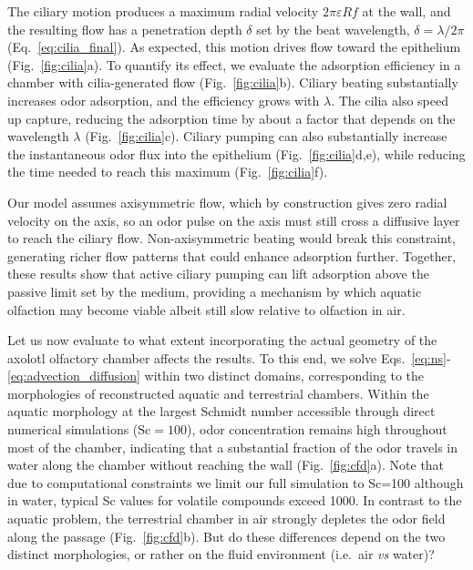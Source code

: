 \documentclass[%
 twocolumn,
 amsmath,amssymb,
 aps,prfluids,
 superscriptaddress,
]{revtex4-2}
\newcommand{\Sc}{\mathrm{Sc}}
\begin{document}
The ciliary motion produces a maximum radial velocity $2\pi\varepsilon R  f$ at the wall, and the resulting flow has a penetration depth $\delta$ set by the beat wavelength, $\delta = \lambda/2\pi$ (Eq.~\eqref{eq:cilia_final}). As expected, this motion drives flow toward the epithelium (Fig.~\ref{fig:cilia}a). To quantify its effect, we evaluate the adsorption efficiency in a chamber with cilia-generated flow (Fig.~\ref{fig:cilia}b). Ciliary beating substantially increases odor adsorption, and the efficiency grows with $\lambda$. The cilia also speed up capture, reducing the adsorption time by about a factor that depends on the wavelength $\lambda$
(Fig.~\ref{fig:cilia}c). Ciliary pumping can also substantially increase the instantaneous odor flux into the epithelium (Fig.~\ref{fig:cilia}d,e), while reducing the time needed to reach this maximum (Fig.~\ref{fig:cilia}f).

Our model assumes axisymmetric flow, which by construction gives zero radial velocity on the axis, so an odor pulse on the axis must still cross a diffusive layer to reach the ciliary flow. Non-axisymmetric beating would break this constraint, generating richer flow patterns that could enhance adsorption further. Together, these results show that active ciliary pumping can lift adsorption above the passive limit set by the medium, providing a mechanism by which aquatic olfaction may become viable albeit still slow relative to olfaction in air. 

Let us now evaluate to what extent incorporating the actual geometry of the axolotl olfactory chamber affects the results. To this end, we solve Eqs.~\eqref{eq:ns}-\eqref{eq:advection_diffusion} within two distinct domains, corresponding to the morphologies of reconstructed aquatic and terrestrial chambers. Within the aquatic morphology at the largest Schmidt number accessible through direct numerical simulations ($\Sc=100$), odor concentration remains high throughout most of the chamber, indicating that a substantial fraction of the odor %
travels %
in water along the chamber without reaching the wall (Fig.~\ref{fig:cfd}a). Note that due to computational constraints we limit our full simulation to Sc=100 although in water, typical Sc values for volatile compounds exceed 1000. In contrast to the aquatic problem, the terrestrial chamber in air strongly depletes the odor field along the passage (Fig.~\ref{fig:cfd}b).  But do these differences depend on the two distinct morphologies, or rather on the fluid environment (i.e.~air \emph{vs} water)? 
\end{document}
